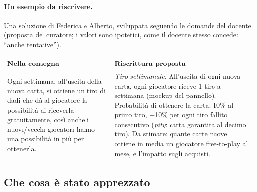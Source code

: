\paragraph{Un esempio da riscrivere.} Una soluzione di Federica e Alberto,
sviluppata seguendo le domande del docente (proposta del curatore; i valori
sono ipotetici, come il docente stesso concede: ``anche tentative'').

\begin{center}
\small
\begin{tabular}{@{}p{}p{}@{}}
  \toprule
  \textbf{Nella consegna} & \textbf{Riscrittura proposta} \\
  \midrule
  Ogni settimana, all'uscita della nuova carta, si ottiene un tiro di dadi
  che dà al giocatore la possibilità di riceverla gratuitamente, così anche
  i nuovi/vecchi giocatori hanno una possibilità in più per ottenerla.
  &
  \emph{Tiro settimanale.} All'uscita di ogni nuova carta, ogni giocatore
  riceve 1 tiro a settimana (mockup del pannello). Probabilità di ottenere
  la carta: 10\% al primo tiro, +10\% per ogni tiro fallito consecutivo
  (\emph{pity}: carta garantita al decimo tiro). Da stimare: quante carte
  nuove ottiene in media un giocatore free-to-play al mese, e l'impatto sugli
  acquisti. \\
  \bottomrule
\end{tabular}
\end{center}

\subsection{Che cosa è stato apprezzato}
\label{rv:t3:sec:apprezzato}

